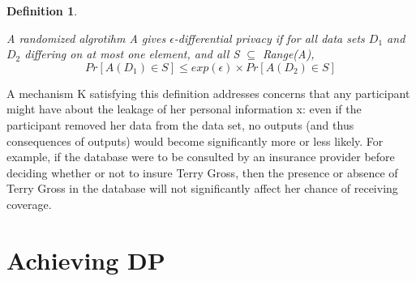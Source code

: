 \documentclass{article}
\newtheorem{defn}[thm]{Definition}
\newenvironment{definition}{\begin{defn}\begin{em}}%
{\end{em}\end{defn}}
\begin{document}
\begin{definition}
A randomized algrotihm A gives $\epsilon$-differential privacy if for all
data sets $D_1$ and $D_2$ differing on at most one element, and all S $\subseteq$ Range(A),
\begin{equation}
Pr[A(D_1) \in S] \leq exp(\epsilon) \times Pr[A(D_2) \in S]
\end{equation}
\end{definition}

A mechanism K satisfying this definition addresses concerns that any participant
might have about the leakage of her personal information x: even if the participant
removed her data from the data set, no outputs (and thus consequences
of outputs) would become significantly more or less likely. For example, if the
database were to be consulted by an insurance provider before deciding whether
or not to insure Terry Gross, then the presence or absence of Terry Gross in the
database will not significantly affect her chance of receiving coverage.


\section{Achieving DP}




%
%
\end{document}

